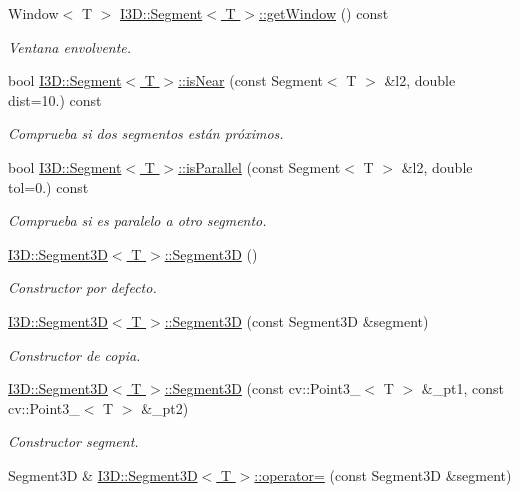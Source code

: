\begin{DoxyCompactItemize}
Window$<$ T $>$ \hyperlink{group___geometric_entities_ga3e11e0ecacba2003a023a21943693263}{I3\+D\+::\+Segment$<$ T $>$\+::get\+Window} () const 
\begin{DoxyCompactList}\small\item\em Ventana envolvente. \end{DoxyCompactList}\item 
bool \hyperlink{group___geometric_entities_ga59115064a0b57956175099eb3ff213ff}{I3\+D\+::\+Segment$<$ T $>$\+::is\+Near} (const Segment$<$ T $>$ \&l2, double dist=10.) const 
\begin{DoxyCompactList}\small\item\em Comprueba si dos segmentos están próximos. \end{DoxyCompactList}\item 
bool \hyperlink{group___geometric_entities_ga7a4bcb31c98bdb2e239bdb64073e8874}{I3\+D\+::\+Segment$<$ T $>$\+::is\+Parallel} (const Segment$<$ T $>$ \&l2, double tol=0.) const 
\begin{DoxyCompactList}\small\item\em Comprueba si es paralelo a otro segmento. \end{DoxyCompactList}\item 
\hyperlink{group___geometric_entities_ga726c1cdb80b816445604fc035f0b709b}{I3\+D\+::\+Segment3\+D$<$ T $>$\+::\+Segment3D} ()
\begin{DoxyCompactList}\small\item\em Constructor por defecto. \end{DoxyCompactList}\item 
\hyperlink{group___geometric_entities_gad0a6b6c727b4f675429acb7a28518cbd}{I3\+D\+::\+Segment3\+D$<$ T $>$\+::\+Segment3D} (const Segment3D \&segment)
\begin{DoxyCompactList}\small\item\em Constructor de copia. \end{DoxyCompactList}\item 
\hyperlink{group___geometric_entities_ga7a2024be1820ddc19158004932d79882}{I3\+D\+::\+Segment3\+D$<$ T $>$\+::\+Segment3D} (const cv\+::\+Point3\+\_\+$<$ T $>$ \&\+\_\+pt1, const cv\+::\+Point3\+\_\+$<$ T $>$ \&\+\_\+pt2)
\begin{DoxyCompactList}\small\item\em Constructor segment. \end{DoxyCompactList}\item 
Segment3D \& \hyperlink{group___geometric_entities_gaa95bd137286b52bc178a569720bea3d6}{I3\+D\+::\+Segment3\+D$<$ T $>$\+::operator=} (const Segment3D \&segment)

\end{DoxyCompactItemize}
